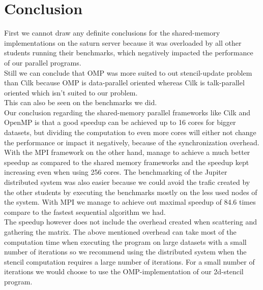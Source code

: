 \documentclass[11pt]{article}
\begin{document}
\section{Conclusion}
First we cannot draw any definite conclusions for the shared-memory implementations on the saturn server because it was overloaded by all other students running their benchmarks, which negatively impacted the performance of our parallel programs. \\
Still we can conclude that OMP was more suited to out stencil-update problem than Cilk because OMP is data-parallel oriented whereas Cilk is talk-parallel oriented which isn't suited to our problem.\\
This can also be seen on the benchmarks we did. \\
Our conclusion regarding the shared-memory parallel frameworks like Cilk and OpenMP is that a good speedup can be achieved up to 16 cores for bigger datasets, but dividing the computation to even more cores will either not change the performance or impact it negatively, because of the synchronization overhead.\\ 
With the MPI framework on the other hand, manage to achieve a much better speedup as compared to the shared memory frameworks and the speedup kept increasing even when using 256 cores. The benchmarking of the Jupiter distributed system was also easier because we could avoid the trafic created by the other students by executing the benchmarks mostly on the less used nodes of the system. With MPI we manage to achieve out maximal speedup of 84.6 times compare to the fastest sequential algorithm we had.\\
The speedup however does not include the overhead created when scattering and gathering the matrix. The above mentioned overhead can take most of the computation time when executing the program on large datasets with a small number of iterations so we recommend using the distributed system when the stencil computation requires a large number of iterations.
For a small number of iterations we would choose to use the OMP-implementation of our 2d-stencil program. 
\end{document}
